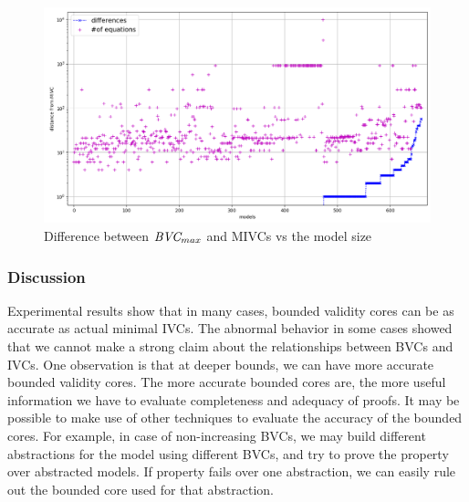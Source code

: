  \begin{figure}
 \centering
  \includegraphics[width=\columnwidth]{figs/bvc_modelsize_yices.png}
  \caption{Difference between $\textit{BVC} _{max}$ and MIVCs vs the model size}
  \vspace{0.1in}
  \label{fig:bvc-size}
\end{figure}

\vspace{0.1in}
\subsubsection{Discussion}
Experimental results show that in many cases, bounded validity cores can be as accurate as actual minimal IVCs. The abnormal behavior in some cases showed that we cannot make a strong claim about the relationships between BVCs and IVCs. One observation is that at deeper bounds, we can have more accurate bounded validity cores. The more accurate bounded cores are, the more useful information we have to evaluate completeness and adequacy of proofs. It may be possible to make use of other techniques to evaluate the accuracy of the bounded cores. For example, in case of non-increasing BVCs, we may build different abstractions for the model using different BVCs, and try to prove the property over abstracted models. If property fails over one abstraction, we can easily rule out the bounded core used for that abstraction. 